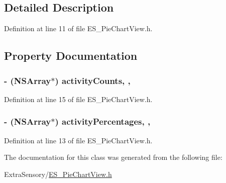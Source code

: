 \subsection{Detailed Description}


Definition at line 11 of file E\+S\+\_\+\+Pie\+Chart\+View.\+h.



\subsection{Property Documentation}
\hypertarget{interface_e_s___pie_chart_view_a43a1fc1218a3bb71bf98106123e5e360}{
\subsubsection[{activity\+Counts}]{\setlength{\rightskip}{0pt plus 5cm}-\/ (N\+S\+Array$\ast$) activity\+Counts\hspace{0.3cm}{\ttfamily [read]}, {\ttfamily [write]}, {\ttfamily [atomic]}}}\label{interface_e_s___pie_chart_view_a43a1fc1218a3bb71bf98106123e5e360}


Definition at line 15 of file E\+S\+\_\+\+Pie\+Chart\+View.\+h.

\hypertarget{interface_e_s___pie_chart_view_a7ac9fe97aae757b3ff14691d9802fda2}{
\subsubsection[{activity\+Percentages}]{\setlength{\rightskip}{0pt plus 5cm}-\/ (N\+S\+Array$\ast$) activity\+Percentages\hspace{0.3cm}{\ttfamily [read]}, {\ttfamily [write]}, {\ttfamily [atomic]}}}\label{interface_e_s___pie_chart_view_a7ac9fe97aae757b3ff14691d9802fda2}


Definition at line 13 of file E\+S\+\_\+\+Pie\+Chart\+View.\+h.



The documentation for this class was generated from the following file\+:\begin{DoxyCompactItemize}
\item 
Extra\+Sensory/\hyperlink{_e_s___pie_chart_view_8h}{E\+S\+\_\+\+Pie\+Chart\+View.\+h}\end{DoxyCompactItemize}
